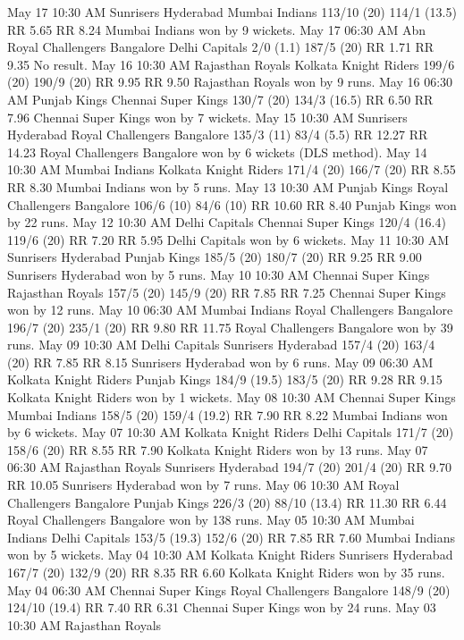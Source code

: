 May 17
10:30 AM
Sunrisers Hyderabad
Mumbai Indians
113/10 (20)
114/1 (13.5)
RR 5.65
RR 8.24
Mumbai Indians won by 9 wickets.
May 17
06:30 AM
Abn
Royal Challengers Bangalore
Delhi Capitals
2/0 (1.1)
187/5 (20)
RR 1.71
RR 9.35
No result.
May 16
10:30 AM
Rajasthan Royals
Kolkata Knight Riders
199/6 (20)
190/9 (20)
RR 9.95
RR 9.50
Rajasthan Royals won by 9 runs.
May 16
06:30 AM
Punjab Kings
Chennai Super Kings
130/7 (20)
134/3 (16.5)
RR 6.50
RR 7.96
Chennai Super Kings won by 7 wickets.
May 15
10:30 AM
Sunrisers Hyderabad
Royal Challengers Bangalore
135/3 (11)
83/4 (5.5)
RR 12.27
RR 14.23
Royal Challengers Bangalore won by 6 wickets (DLS method).
May 14
10:30 AM
Mumbai Indians
Kolkata Knight Riders
171/4 (20)
166/7 (20)
RR 8.55
RR 8.30
Mumbai Indians won by 5 runs.
May 13
10:30 AM
Punjab Kings
Royal Challengers Bangalore
106/6 (10)
84/6 (10)
RR 10.60
RR 8.40
Punjab Kings won by 22 runs.
May 12
10:30 AM
Delhi Capitals
Chennai Super Kings
120/4 (16.4)
119/6 (20)
RR 7.20
RR 5.95
Delhi Capitals won by 6 wickets.
May 11
10:30 AM
Sunrisers Hyderabad
Punjab Kings
185/5 (20)
180/7 (20)
RR 9.25
RR 9.00
Sunrisers Hyderabad won by 5 runs.
May 10
10:30 AM
Chennai Super Kings
Rajasthan Royals
157/5 (20)
145/9 (20)
RR 7.85
RR 7.25
Chennai Super Kings won by 12 runs.
May 10
06:30 AM
Mumbai Indians
Royal Challengers Bangalore
196/7 (20)
235/1 (20)
RR 9.80
RR 11.75
Royal Challengers Bangalore won by 39 runs.
May 09
10:30 AM
Delhi Capitals
Sunrisers Hyderabad
157/4 (20)
163/4 (20)
RR 7.85
RR 8.15
Sunrisers Hyderabad won by 6 runs.
May 09
06:30 AM
Kolkata Knight Riders
Punjab Kings
184/9 (19.5)
183/5 (20)
RR 9.28
RR 9.15
Kolkata Knight Riders won by 1 wickets.
May 08
10:30 AM
Chennai Super Kings
Mumbai Indians
158/5 (20)
159/4 (19.2)
RR 7.90
RR 8.22
Mumbai Indians won by 6 wickets.
May 07
10:30 AM
Kolkata Knight Riders
Delhi Capitals
171/7 (20)
158/6 (20)
RR 8.55
RR 7.90
Kolkata Knight Riders won by 13 runs.
May 07
06:30 AM
Rajasthan Royals
Sunrisers Hyderabad
194/7 (20)
201/4 (20)
RR 9.70
RR 10.05
Sunrisers Hyderabad won by 7 runs.
May 06
10:30 AM
Royal Challengers Bangalore
Punjab Kings
226/3 (20)
88/10 (13.4)
RR 11.30
RR 6.44
Royal Challengers Bangalore won by 138 runs.
May 05
10:30 AM
Mumbai Indians
Delhi Capitals
153/5 (19.3)
152/6 (20)
RR 7.85
RR 7.60
Mumbai Indians won by 5 wickets.
May 04
10:30 AM
Kolkata Knight Riders
Sunrisers Hyderabad
167/7 (20)
132/9 (20)
RR 8.35
RR 6.60
Kolkata Knight Riders won by 35 runs.
May 04
06:30 AM
Chennai Super Kings
Royal Challengers Bangalore
148/9 (20)
124/10 (19.4)
RR 7.40
RR 6.31
Chennai Super Kings won by 24 runs.
May 03
10:30 AM
Rajasthan Royals
